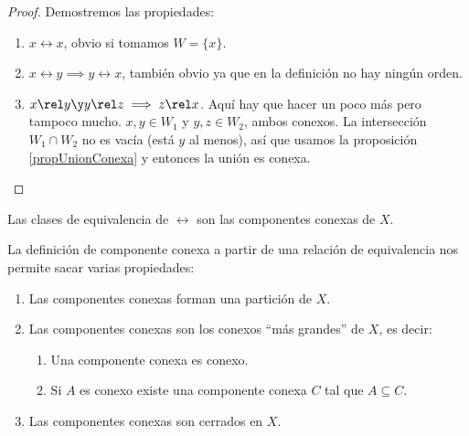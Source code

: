 \documentclass{apuntes}
\begin{document}
\begin{proof} Demostremos las propiedades:

\begin{enumerate}
\item $x\rel x$, obvio si tomamos $W = \{ x \}$.
\item $x\rel y \implies y \rel x$, también obvio ya que en la definición no hay ningún orden.
\item $x\rel y \y y \rel z \implies z \rel x$. Aquí hay que hacer un poco más pero tampoco mucho. $x,y∈W_1$ y $y,z∈W_2$, ambos conexos. La intersección $W_1∩ W_2$ no es vacía (está $y$ al menos), así que usamos la proposición \ref{propUnionConexa} y entonces la unión es conexa.
\end{enumerate}
\end{proof}

\begin{defn} Las clases de equivalencia de $\rel$ son las componentes conexas de $X$.\end{defn}

\begin{prop} La definición de componente conexa a partir de una relación de equivalencia nos permite sacar varias propiedades:


\begin{enumerate}
\item Las componentes conexas forman una partición de $X$.
\item Las componentes conexas son los conexos ``más grandes'' de $X$, es decir:
\begin{enumerate}
\item Una componente conexa es conexo.
\item Si $A$ es conexo existe una componente conexa $C$ tal que $A⊆C$.
\end{enumerate}
\item Las componentes conexas son cerrados en $X$.
\end{enumerate}
\end{prop}
\end{document}

